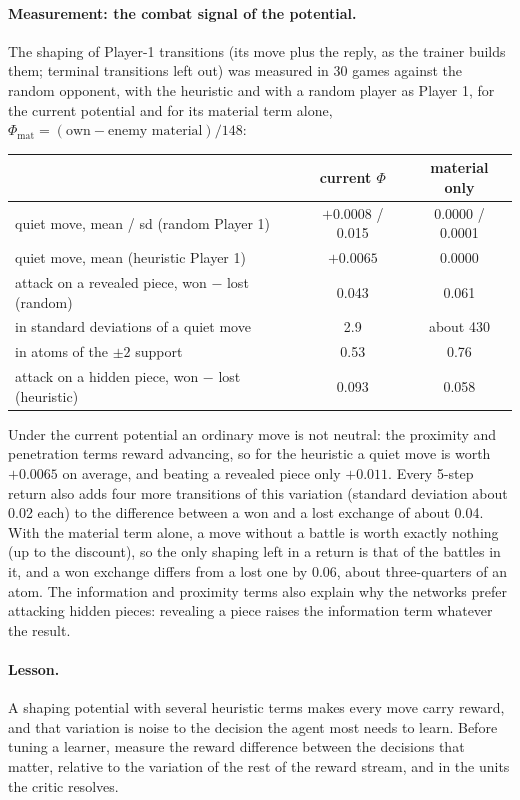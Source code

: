 \paragraph{Measurement: the combat signal of the potential.} The shaping of Player-1
transitions (its move plus the reply, as the trainer builds them; terminal transitions left out)
was measured in 30 games against the random opponent, with the heuristic and with a random player
as Player 1, for the current potential and for its material term alone,
$\Phi_{\mathrm{mat}} = (\text{own} - \text{enemy material}) / 148$:
\begin{center}
\begin{tabular}{lcc}
\toprule
 & current $\Phi$ & material only \\
\midrule
quiet move, mean / sd (random Player 1)        & $+0.0008$ / 0.015 & $0.0000$ / 0.0001 \\
quiet move, mean (heuristic Player 1)          & $+0.0065$         & $0.0000$ \\
attack on a revealed piece, won $-$ lost (random) & 0.043          & 0.061 \\
\quad in standard deviations of a quiet move   & 2.9               & about 430 \\
\quad in atoms of the $\pm 2$ support          & 0.53              & 0.76 \\
attack on a hidden piece, won $-$ lost (heuristic) & 0.093         & 0.058 \\
\bottomrule
\end{tabular}
\end{center}
Under the current potential an ordinary move is not neutral: the proximity and penetration terms
reward advancing, so for the heuristic a quiet move is worth $+0.0065$ on average, and beating a
revealed piece only $+0.011$. Every 5-step return also adds four more transitions of this
variation (standard deviation about 0.02 each) to the difference between a won and a lost
exchange of about 0.04. With the material term alone, a move without a battle is worth exactly
nothing (up to the discount), so the only shaping left in a return is that of the battles in it,
and a won exchange differs from a lost one by 0.06, about three-quarters of an atom. The
information and proximity terms also explain why the networks prefer attacking hidden pieces:
revealing a piece raises the information term whatever the result.

\paragraph{Lesson.} A shaping potential with several heuristic terms makes every move carry
reward, and that variation is noise to the decision the agent most needs to learn. Before tuning
a learner, measure the reward difference between the decisions that matter, relative to the
variation of the rest of the reward stream, and in the units the critic resolves.

